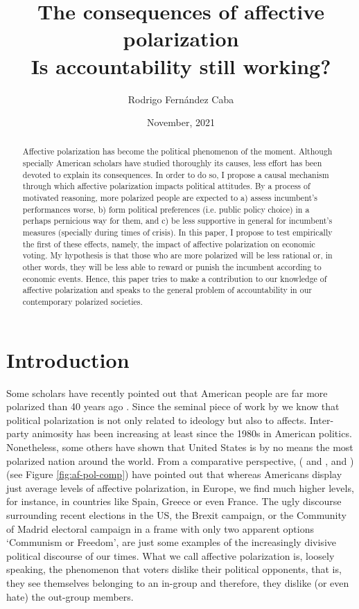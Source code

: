 \documentclass[a4paper, svgnames]{article}
\title{\vspace{-40pt}\textbf{The consequences of affective polarization\\ \Large Is accountability still working?}}
\author{Rodrigo Fernández Caba}
\date{\vspace{-5pt} November, 2021}
\begin{document}
\maketitle

\begin{abstract}
	Affective polarization has become the political phenomenon of the moment. Although specially American scholars have studied thoroughly its causes, less effort has been devoted to explain its consequences. In order to do so, I propose a causal mechanism through which affective polarization impacts political attitudes. By a process of motivated reasoning, more polarized people are expected to a) assess incumbent's performances worse, b) form political preferences (i.e. public policy choice) in a perhaps pernicious way for them, and c) be less supportive in general for incumbent's measures (specially during times of crisis). In this paper, I propose to test empirically the first of these effects, namely, the impact of affective polarization on economic voting. My hypothesis is that those who are more polarized will be less rational or, in other words, they will be less able to reward or punish the incumbent according to economic events. Hence, this paper tries to make a contribution to our knowledge of affective polarization and speaks to the general problem of accountability in our contemporary polarized societies.
\end{abstract}


\section{Introduction}

Some scholars have recently pointed out that American people are far more polarized than 40 years ago \citep{Lelkes2018}. Since the seminal piece of work by \cite{Iyengar2012} we know that political polarization is not only related to ideology but also to affects. Inter-party animosity has been increasing at least since the 1980s in American politics. Nonetheless, some others have shown that United States is by no means the most polarized nation around the world. From a comparative perspective, (\citeauthor{Gidron2018} \citeyear{Gidron2018} and \citeyear{Gidron2019}, and \cite{WESTWOOD2018}) (see Figure \ref{fig:af-pol-comp}) have pointed out that whereas Americans display just average levels of affective polarization, in Europe, we find much higher levels, for instance, in countries like Spain, Greece or even France. The ugly discourse surrounding recent elections in the US, the Brexit campaign, or the Community of Madrid electoral campaign in a frame with only two apparent options `Communism or Freedom', are just some examples of the increasingly divisive political discourse of our times. What we call affective polarization is, loosely speaking, the phenomenon that voters dislike their political opponents, that is, they see themselves belonging to an in-group and therefore, they dislike (or even hate) the out-group members.
\end{document}
